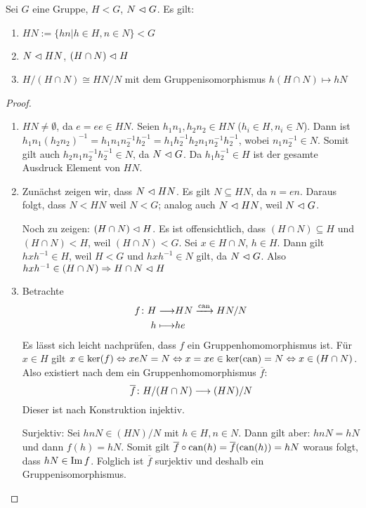 \documentclass[12pt,a4paper]{scrartcl}
\begin{document}
\begin{satz}[1. Isomorphiesatz] \label{thm:iso1_g}
	Sei $G$ eine Gruppe, $H<G$, $N\vartriangleleft G$. Es gilt:
	\begin{enumerate}
		\item $HN:=\{hn|h\in H, n\in N\}<G$
		\item $N\vartriangleleft HN$, $(H\cap N)\vartriangleleft H$
		\item $H/(H\cap N) \cong HN/N$ mit dem Gruppenisomorphismus $h(H\cap N)\mapsto hN$
	\end{enumerate}
\end{satz}	
\begin{proof}
	\leavevmode
	\begin{enumerate}
		\item $HN\neq \emptyset$, da $e = ee\in HN$. Seien $h_1n_1,h_2n_2\in HN$ ($h_i\in H, n_i\in N$). Dann ist $h_1n_1(h_2n_2)^{-1} = h_1n_1n_2^{-1}h_2^{-1} = h_1h_2^{-1}h_2n_1n_2^{-1}h_2^{-1}$, wobei $n_1n_2^{-1}\in N$. Somit gilt auch $h_2n_1n_2^{-1}h_2^{-1}\in N$, da $N\vartriangleleft G$. Da $h_1h_2^{-1}\in H$ ist der gesamte Ausdruck Element von $HN$.
		\item Zunächst zeigen wir, dass $N\vartriangleleft HN$. Es gilt $N\subseteq HN$, da $n = en$. Daraus folgt, dass $N<HN$ weil $N<G$; analog auch $N\vartriangleleft HN$, weil $N\vartriangleleft G$.
		
		Noch zu zeigen: $(H\cap N)\vartriangleleft H$. Es ist offensichtlich, dass $(H\cap N)\subseteq H$ und $(H\cap N)<H$, weil $(H\cap N)<G$. Sei $x\in H\cap N$, $h\in H$. Dann gilt $hxh^{-1}\in H$, weil $H<G$ und $hxh^{-1} \in N$ gilt, da $N\vartriangleleft G$. Also $hxh^{-1}\in (H\cap N) \Rightarrow H\cap N\vartriangleleft H$
		\item Betrachte 
		\begin{align*}
			f\colon H \longrightarrow& HN \xrightarrow{\operatorname{can}} HN/N\\
			h \longmapsto &he
		\end{align*}
		Es lässt sich leicht nachprüfen, dass $f$ ein Gruppenhomomorphismus ist. Für $x\in H$ gilt $x\in \operatorname{ker}(f)\Leftrightarrow xeN = N\Leftrightarrow x = xe\in \operatorname{ker}(\operatorname{can}) = N\Leftrightarrow x\in (H\cap N)$. Also existiert nach dem  ein Gruppenhomomorphismus $\overline{f}$:
		\begin{equation*}
			\overline{f}\colon H/(H\cap N)\longrightarrow (HN)/N
		\end{equation*}
		Dieser ist nach Konstruktion injektiv.
		
		Surjektiv: Sei $hnN\in (HN)/N$ mit $h\in H, n\in N$. Dann gilt aber: $hnN = hN$ und dann $f(h)=hN$. Somit gilt $\overline{f}\circ\operatorname{can}(h) = \overline{f}(\operatorname{can}(h)) = hN$ woraus folgt, dass $hN\in \operatorname{Im} f$. Folglich ist $\overline{f}$ surjektiv und deshalb ein Gruppenisomorphismus.
	\end{enumerate}
\end{proof}
\end{document}

